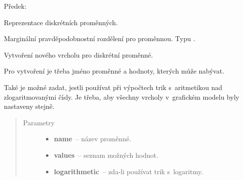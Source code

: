 \begin{fulllineitems}
\label{alex.infer:alex.infer.factor.alex.infer.node.DiscreteVariableNode}
Předek: {\hyperref[alex.infer:alex.infer.factor.alex.infer.node.VariableNode]{}}

Reprezentace diskrétních proměnných.

\begin{fulllineitems}
\label{alex.infer:alex.infer.factor.alex.infer.node.DiscreteVariableNode.belief}
Marginální pravděpodobnostní rozdělení pro proměnnou. Typu {\hyperref[alex.infer:alex.infer.factor.Factor]{}}.

\end{fulllineitems}


\begin{fulllineitems}
\label{alex.infer:alex.infer.factor.alex.infer.node.DiscreteVariableNode.__init__}
Vytvoření nového vrcholu pro diskrétní proměnné.

Pro vytvoření je třeba jméno proměnné a hodnoty, kterých může nabývat.

Také je možné zadat, jestli používat při výpočtech trik s~aritmetikou nad zlogaritmovanými čísly.
Je třeba, aby všechny vrcholy v~grafickém modelu byly nastaveny stejně.
\begin{quote}\begin{description}
\item[{Parametry}] \leavevmode\begin{itemize}
\item {} 
\textbf{name}~-- název proměnné.

\item {} 
\textbf{values}~-- seznam možných hodnot.

\item {} 
\textbf{logarithmetic}~-- zda-li používat trik s~logaritmy.

\end{itemize}

\end{description}\end{quote}


\end{fulllineitems}
\end{fulllineitems}
